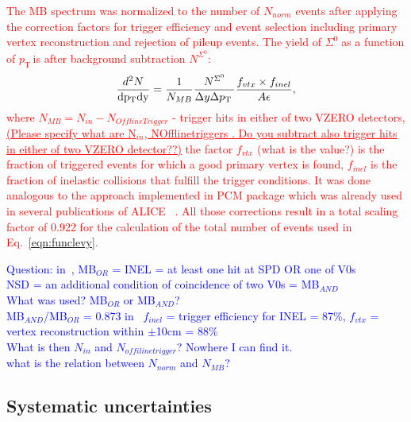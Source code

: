 \documentclass[ALICE,manyauthors]{cernphprep}
\newcommand{\sig}{\ensuremath{\Sigma^0  \; }}
\newcommand{\pt}{\ensuremath{p_{\mathrm{T}\; }}}
\newcommand{\red}{\textcolor{red}}
\newcommand{\blue}{\textcolor{blue}}
\begin{document}
\red{The MB spectrum was normalized to the number of
$N_{norm}$ events after applying the correction factors for trigger efficiency and event selection including primary vertex reconstruction and rejection of pileup events.
The yield of \sig as a function of \pt is after background subtraction $N^{\Sigma^0}$:
\begin{equation}
\frac{d^2N}{\rm{d}p_{\rm{T}}\rm{d}y } =   \frac{1}{N_{MB}} \frac{N^{\Sigma^0}}{\Delta y \Delta \pt}
\frac{ f_{vtx} \times f_{inel}}{A \epsilon} ,
\label{eq:normMB}
\end{equation}
where
$N_{MB} = N_{in} - N_{OfflineTrigger}$  - trigger hits in either of two VZERO detectors,\\
\underline{(Please specify what are N$_{in}$, NOfflinetriggers .  
Do you subtract also trigger hits in either of two VZERO detector??)}
the factor $f_{vtx}$ (what is the value?) is the fraction of triggered events for which a good primary vertex is found,
$ f_{inel}$ is the fraction of inelastic collisions that fulfill the trigger conditions.
It was done analogous to the approach implemented in PCM package which
was already  used in several publications of ALICE~\cite{cite:ALICE2015-InclPhot-pp,cite:ALICE-DirPhot2016} .
All those corrections result in a total scaling factor of 0.922 for the calculation of the total number of events used in Eq.~\ref{eqn:funclevy}.}

\blue{Question: 
in~\cite{cite:ALICE2015-InclPhot-pp}, MB$_{OR}$ = INEL = at least one hit at SPD OR one of V0s\\
NSD = an additional condition of coincidence of two V0s = MB$_{AND}$\\
What was used? MB$_{OR}$ or MB$_{AND}$? \\
MB$_{AND}$/MB$_{OR}$ = 0.873
in~\cite{cite:NSD, cite:Xi_c} $f_{inel}$ = trigger efficiency for INEL = 87\%, $f_{vtx}$ = vertex reconstruction within $\pm$10cm = 88\%\\
What is then $N_{in}$ and $N_{offilinetrigger}$? Nowhere I can find it.\\
what is the relation between $N_{norm}$ and $N_{MB}$?}

 \subsection{Systematic uncertainties} 

\label{subsec:systematics}
\end{document}
